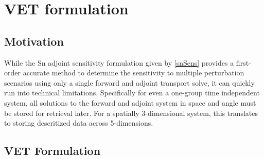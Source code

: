 \documentclass{article}
\begin{document}
\section{VET formulation}

\subsection{Motivation} 

While the Sn adjoint sensitivity formulation given by \ref{snSens} provides a first-order accurate method to determine the sensitivity to multiple perturbation scenarios using only a single forward and adjoint transport solve, it can quickly run into technical limitations. Specifically for even a one-group time independent system, all solutions to the forward and adjoint system in space and angle must be stored for retrieval later. For a spatially 3-dimensional system, this translates to storing descritized data across 5-dimensions.


\subsection{VET Formulation}
\end{document}
